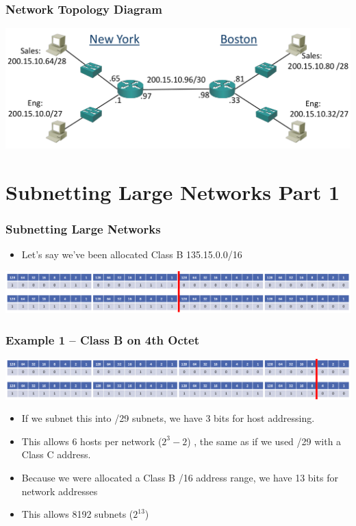 \documentclass[pdflatex,compress]{beamer}
\begin{document}
\begin{frame}
	\frametitle{Network Topology Diagram}
	\begin{center}
		\includegraphics[width=\linewidth]{img/img15}
	\end{center}
\end{frame}

\section{Subnetting Large Networks Part 1}

\begin{frame}
	\frametitle{Subnetting Large Networks}
	\begin{itemize}
		\item Let’s say we’ve been allocated Class B 135.15.0.0/16
	\end{itemize}
	\begin{center}
		\includegraphics[width=\linewidth]{img/img16}
	\end{center}
\end{frame}

\begin{frame}
	\frametitle{Example 1 – Class B on 4th Octet}
	\begin{center}
		\includegraphics[width=\linewidth]{img/img17}
	\end{center}
	\begin{itemize}
		\item If we subnet this into /29 subnets, we have 3 bits for host addressing.
		\item This allows 6 hosts per network ($ 2^3 - 2 $) , the same as if we used /29 with a Class C address.
		\item Because we were allocated a Class B /16 address range, we have 13 bits for network addresses
		\item This allows 8192 subnets ($ 2^{13} $)
	\end{itemize}
\end{frame}
\end{document}

